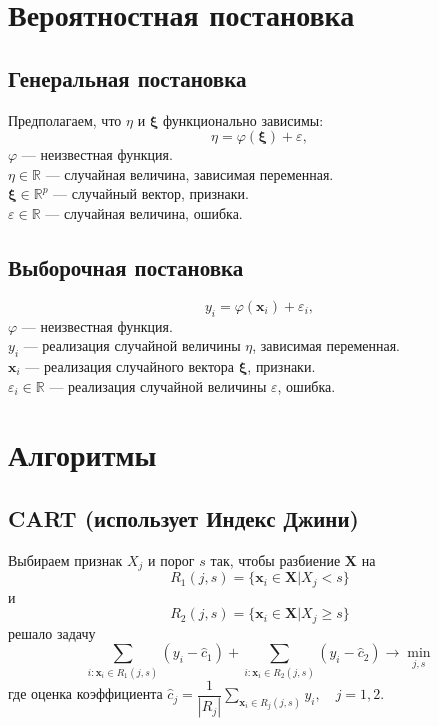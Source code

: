\documentclass{article}
\renewcommand{\geq}{\geqslant}
\theoremstyle{definition}
\theoremstyle{theorem}
\theoremstyle{remark}
\theoremstyle{theorem}
\theoremstyle{example}
\theoremstyle{theorem}
\theoremstyle{theorem}
\theoremstyle{theorem}
\theoremstyle{theorem}
\begin{document}
\section{Вероятностная постановка}

\subsection{Генеральная постановка}

Предполагаем, что $\eta$ и $\bm{\xi}$ функционально зависимы:
\begin{equation}
	\eta = \varphi(\bm{\xi}) + \varepsilon,
\end{equation}
$\varphi$ --- неизвестная функция.\\
$\eta \in \mathbb{R}$ --- случайная величина, зависимая переменная.\\
$\bm{\xi} \in \mathbb{R}^p$ --- случайный вектор, признаки.\\
$\varepsilon \in \mathbb{R}$ --- случайная величина, ошибка.\\

\subsection{Выборочная постановка}

\begin{equation}
	y_i = \varphi(\textbf{x}_i) + \varepsilon_i,
\end{equation}
\noindent$\varphi$ --- неизвестная функция.\\
$y_i$ --- реализация случайной величины $\eta$, зависимая переменная.\\
$\textbf{x}_i$ --- реализация случайного вектора $\bm{\xi}$, признаки.\\
$\varepsilon_i \in \mathbb{R}$ --- реализация случайной величины $\varepsilon$, ошибка.\\

\newpage

\section{Алгоритмы}

\subsection{CART (использует Индекс Джини)}

\noindent Выбираем признак $X_j$ и порог $s$ так, чтобы разбиение $\textbf{X}$ на
$$R_1(j,s) = \{ \textbf{x}_i \in \textbf{X} | X_j < s \}$$
и
$$R_2(j,s) = \{ \textbf{x}_i \in \textbf{X} | X_j \geq s \}$$
решало задачу
\begin{equation}
	\sum\limits_{i:\textbf{x}_i \in R_1 (j,s)} (y_i - \hat{c}_1) + 	\sum\limits_{i:\textbf{x}_i \in R_2 (j,s)} (y_i - \hat{c}_2) \to \min_{j,s}
\end{equation}
где оценка коэффициента $\hat{c}_j = \dfrac{1}{|R_j|} \sum\limits_{\textbf{x}_i \in R_j(j,s)} y_i, \quad j = 1,2.$\\
\end{document}
